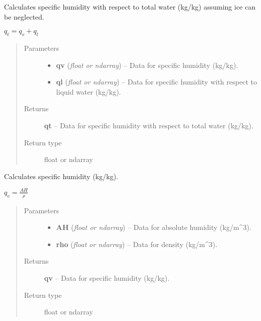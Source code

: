 \documentclass[letterpaper,10pt,english]{sphinxmanual}
\begin{document}
\begin{fulllineitems}
\label{atmos:atmos.equations.qt_from_qv_ql}
Calculates specific humidity with respect to total water (kg/kg) assuming ice
can be neglected.

\(q_t = q_v+q_l\)
\begin{quote}\begin{description}
\item[{Parameters}] \leavevmode\begin{itemize}
\item {} 
\textbf{qv} (\emph{float or ndarray}) -- Data for specific humidity (kg/kg).

\item {} 
\textbf{ql} (\emph{float or ndarray}) -- Data for specific humidity with respect to liquid water (kg/kg).

\end{itemize}

\item[{Returns}] \leavevmode
\textbf{qt} --
Data for specific humidity with respect to total water (kg/kg).

\item[{Return type}] \leavevmode
float or ndarray

\end{description}\end{quote}

\end{fulllineitems}


\begin{fulllineitems}
\label{atmos:atmos.equations.qv_from_AH_rho}
Calculates specific humidity (kg/kg).

\(q_v = \frac{AH}{\rho}\)
\begin{quote}\begin{description}
\item[{Parameters}] \leavevmode\begin{itemize}
\item {} 
\textbf{AH} (\emph{float or ndarray}) -- Data for absolute humidity (kg/m\textasciicircum{}3).

\item {} 
\textbf{rho} (\emph{float or ndarray}) -- Data for density (kg/m\textasciicircum{}3).

\end{itemize}

\item[{Returns}] \leavevmode
\textbf{qv} --
Data for specific humidity (kg/kg).

\item[{Return type}] \leavevmode
float or ndarray

\end{description}\end{quote}

\end{fulllineitems}
\end{document}
